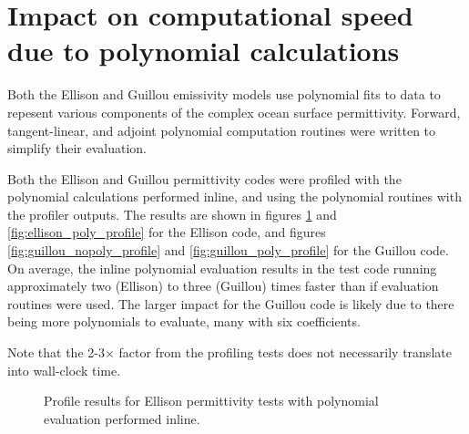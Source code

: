 \section{Impact on computational speed due to polynomial calculations}
\label{sec:Poly_Routine_Speed.appendix}
Both the Ellison \cite{Ellison_etal_2003} and Guillou \cite{Guillou_etal_1998} emissivity models use polynomial fits to data to repesent various components of the complex ocean surface permittivity. Forward, tangent-linear, and adjoint polynomial computation routines were written to simplify their evaluation.

Both the Ellison and Guillou permittivity codes were profiled with the polynomial calculations performed inline, and using the polynomial routines with the profiler outputs. The results are shown in figures \ref{fig:ellison_nopoly_profile} and \ref{fig:ellison_poly_profile} for the Ellison code, and figures \ref{fig:guillou_nopoly_profile} and \ref{fig:guillou_poly_profile} for the Guillou code. On average, the inline polynomial evaluation results in the test code running approximately two (Ellison) to three (Guillou) times faster than if evaluation routines were used. The larger impact for the Guillou code is likely due to there being more polynomials to evaluate, many with six coefficients.

Note that the 2-3$\times$ factor from the profiling tests does not necessarily translate into wall-clock time.

\begin{figure}[htp]
  \centering
  \caption{Profile results for Ellison permittivity tests with polynomial evaluation performed inline.}
  \label{fig:ellison_nopoly_profile}
\end{figure}

